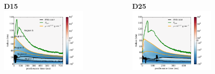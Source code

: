 \documentclass[aspectratio=169]{beamer}
\begin{document}
\begin{frame}

  \begin{columns}[c]

      \begin{figure}
        \textbf{D15}
        \includegraphics[width=1.1\textwidth]{Figures/D15_regions.pdf}
      \end{figure}

      \begin{figure}
        \textbf{D25}
        \includegraphics[width=1.1\textwidth]{Figures/D25_regions.pdf}
      \end{figure}

  \end{columns}

\end{frame}
\end{document}
